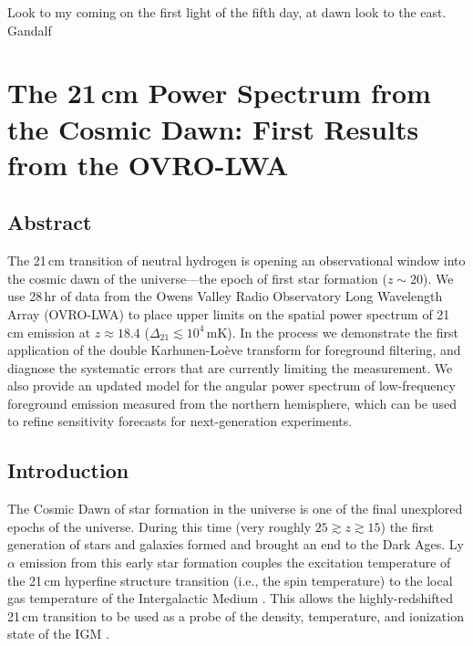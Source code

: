 \cleartoevenpage

\myepigraph
{Look to my coming on the first light of the fifth day, at dawn look to the east.}
{Gandalf}

\chapter{The 21\,cm Power Spectrum from the Cosmic Dawn: First Results from the OVRO-LWA}
\label{chapter4}

\begin{bibunit}

\section*{Abstract}
    The 21\,cm transition of neutral hydrogen is opening an observational window into the cosmic
    dawn of the universe---the epoch of first star formation ($z\sim 20$). We use 28\,hr of data
    from the Owens Valley Radio Observatory Long Wavelength Array (OVRO-LWA) to place upper limits
    on the spatial power spectrum of 21\,cm emission at $z \approx 18.4$ ($\Delta_{21} \lesssim
    10^4\,\text{mK}$). In the process we demonstrate the first application of the double
    Karhunen-Lo\`{e}ve transform for foreground filtering, and diagnose the systematic errors that
    are currently limiting the measurement. We also provide an updated model for the angular power
    spectrum of low-frequency foreground emission measured from the northern hemisphere, which can
    be used to refine sensitivity forecasts for next-generation experiments.

\section{Introduction}\label{sec:introduction}

The Cosmic Dawn of star formation in the universe is one of the final unexplored epochs of the
universe. During this time (very roughly $25 \gtrsim z \gtrsim 15$) the first generation of stars
and galaxies formed and brought an end to the Dark Ages. Ly$\alpha$ emission from this early star
formation couples the excitation temperature of the 21\,cm hyperfine structure transition (i.e., the
spin temperature) to the local gas temperature of the Intergalactic Medium
\citep[IGM;][]{1952AJ.....57R..31W, 1958PIRE...46..240F}. This allows the highly-redshifted 21\,cm
transition to be used as a probe of the density, temperature, and ionization state of the IGM
\citep[e.g.,][]{2006PhR...433..181F, 2012RPPh...75h6901P}.


\end{bibunit}
